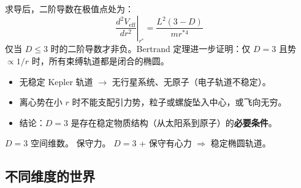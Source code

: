 求导后，二阶导数在极值点处为：
\begin{equation}
\left.\frac{d^2V_{\text{eff}}}{dr^2}\right|_{r^*} = \frac{L^2(3-D)}{mr^{*4}}
\end{equation}
仅当 $D\leq 3$ 时的二阶导数才非负。Bertrand 定理进一步证明：仅 $D=3$ 且势 $\propto 1/r$ 时，所有束缚轨道都是闭合的椭圆。

\begin{limitbox}[反事实：若 $D>3$]
  \begin{itemize}
    \item 无稳定 Kepler 轨道 $\to$ 无行星系统、无原子（电子轨道不稳定）。
    \item 离心势在小 $r$ 时不能支配引力势，粒子或螺旋坠入中心，或飞向无穷。
    \item 结论：$D=3$ 是存在稳定物质结构（从太阳系到原子）的\textbf{必要条件}。
  \end{itemize}
\end{limitbox}

\fbox{[N]} $D=3$ 空间维数。\fbox{[N]} 保守力。\fbox{[S]} $D=3$ + 保守有心力 $\Rightarrow$ 稳定椭圆轨道。

\subsection{不同维度的世界}

